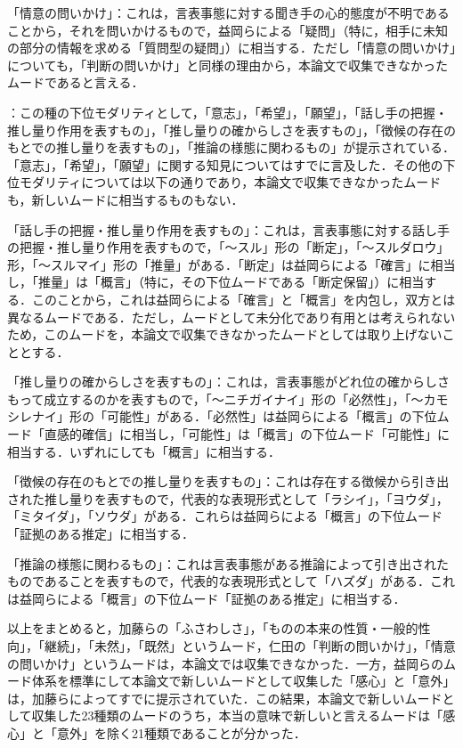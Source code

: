 \documentclass[japanese]{jnlp_1.4}
\newcommand{\InH}[1]{}
\newcommand{\InHone}[1]{}
\begin{document}
\InH{(a-12)}「情意の問いかけ」：これは，言表事態に対する聞き手の心的態度が不明であることから，それを問いかけるもので，益岡らによる「疑問」（特に，相手に未知の部分の情報を求める「質問型の疑問」）に相当する．ただし「情意の問いかけ」についても，「判断の問いかけ」と同様の理由から，本論文で収集できなかったムードであると言える．

\InHone{(b)}
：この種の下位モダリティとして，「意志」，「希望」，「願望」，「話し手の把握・推し量り作用を表すもの」，「推し量りの確からしさを表すもの」，「徴候の存在のもとでの推し量りを表すもの」，「推論の様態に関わるもの」が提示されている．「意志」，「希望」，「願望」に関する知見についてはすでに言及した．その他の下位モダリティについては以下の通りであり，本論文で収集できなかったムードも，新しいムードに相当するものもない．

\InH{(b-1)}「話し手の把握・推し量り作用を表すもの」：これは，言表事態に対する話し手の把握・推し量り作用を表すもので，「〜スル」形の「断定」，「〜スルダロウ」形，「〜スルマイ」形の「推量」がある．「断定」は益岡らによる「確言」に相当し，「推量」は「概言」（特に，その下位ムードである「断定保留」）に相当する．このことから，これは益岡らによる「確言」と「概言」を内包し，双方とは異なるムードである．ただし，ムードとして未分化であり有用とは考えられないため，このムードを，本論文で収集できなかったムードとしては取り上げないこととする．

\InH{(b-2)}「推し量りの確からしさを表すもの」：これは，言表事態がどれ位の確からしさもって成立するのかを表すもので，「〜ニチガイナイ」形の「必然性」，「〜カモシレナイ」形の「可能性」がある．「必然性」は益岡らによる「概言」の下位ムード「直感的確信」に相当し，「可能性」は「概言」の下位ムード「可能性」に相当する．いずれにしても「概言」に相当する．

\InH{(b-3)}「徴候の存在のもとでの推し量りを表すもの」：これは存在する徴候から引き出された推し量りを表すもので，代表的な表現形式として「ラシイ」，「ヨウダ」，「ミタイダ」，「ソウダ」がある．これらは益岡らによる「概言」の下位ムード「証拠のある推定」に相当する．

\InH{(b-4)}「推論の様態に関わるもの」：これは言表事態がある推論によって引き出されたものであることを表すもので，代表的な表現形式として「ハズダ」がある．これは益岡らによる「概言」の下位ムード「証拠のある推定」に相当する．

以上をまとめると，加藤らの「ふさわしさ」，「ものの本来の性質・一般的性向」，「継続」，「未然」，「既然」というムード，仁田の「判断の問いかけ」，「情意の問いかけ」というムードは，本論文では収集できなかった．一方，益岡らのムード体系を標準にして本論文で新しいムードとして収集した「感心」と「意外」は，加藤らによってすでに提示されていた．この結果，本論文で新しいムードとして収集した23種類のムードのうち，本当の意味で新しいと言えるムードは「感心」と「意外」を除く21種類であることが分かった．
\end{document}
